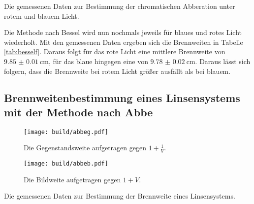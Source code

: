  \begin{table}
 	\centering
 	\caption{Die gemessenen Daten zur Bestimmung der chromatischen Abberation unter rotem und blauem Licht.}
 	
 	\label{tab:besself}
 \end{table}

Die Methode nach Bessel wird nun nochmals jeweils für blaues und rotes Licht wiederholt. Mit den gemessenen Daten ergeben sich die Brennweiten in Tabelle \ref{tab:besself}. Daraus folgt für das rote Licht eine mittlere Brennweite von $\SI{9.85(1)}{\centi\meter}$, für das blaue hingegen eine von $\SI{9.78(2)}{\centi\meter}$. Daraus lässt sich folgern, dass die Brennweite bei rotem Licht größer ausfällt als bei blauem.


\subsection{Brennweitenbestimmung eines Linsensystems mit der Methode nach Abbe}

\begin{figure}
 \centering
 \texttt{[image: build/abbeg.pdf]}
 \caption{Die Gegenstandsweite aufgetragen gegen $1+\frac{1}{V}$.}
 \label{fig:abbeg}
\end{figure}

\begin{figure}
 \centering
 \texttt{[image: build/abbeb.pdf]}
 \caption{Die Bildweite aufgetragen gegen $1+V$.}
 \label{fig:abbeb}
\end{figure}


\begin{table}
 \centering
 \caption{Die gemessenen Daten zur Bestimmung der Brennweite eines Linsensystems.}
 
 \label{tab:abbe}
\end{table}


